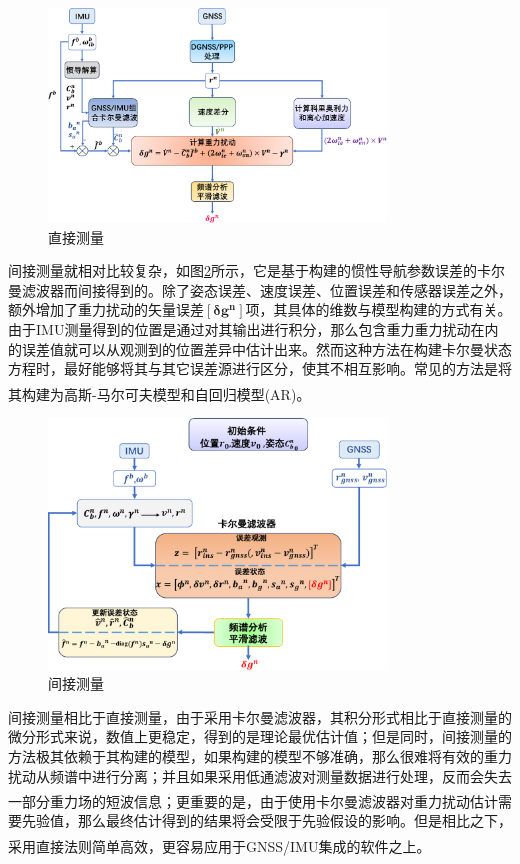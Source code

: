 \documentclass[12pt,a4,utf8]{article}
\newcommand{\upcite}[1]{\textsuperscript{\textsuperscript{\cite{#1}}}} %
\begin{document}
\begin{figure}[h]
      \centering
      \includegraphics[width=0.8\textwidth]{figure/direct-crop.pdf}
      \caption{\label{fig:direct}直接测量}
\end{figure}

间接测量就相对比较复杂，如图\ref{fig:indirect}所示，它是基于构建的惯性导航参数误差的卡尔曼滤波器而间接得到的。除了姿态误差、速度误差、位置误差和传感器误差之外，额外增加了重力扰动的矢量误差$\bm{[\delta g^n]}$项，其具体的维数与模型构建的方式有关。由于IMU测量得到的位置是通过对其输出进行积分，那么包含重力重力扰动在内的误差值就可以从观测到的位置差异中估计出来。然而这种方法在构建卡尔曼状态方程时，最好能够将其与其它误差源进行区分，使其不相互影响。常见的方法是将其构建为高斯-马尔可夫模型\upcite{jekeli1994airborne,jordan1972self}和自回归模型(AR)\upcite{bruton2000improving,nassar2004modeling}。
\begin{figure}[h]
      \centering
      \includegraphics[width=0.8\textwidth]{figure/indirect-crop.pdf}
      \caption{\label{fig:indirect}间接测量}
\end{figure}
间接测量相比于直接测量，由于采用卡尔曼滤波器，其积分形式相比于直接测量的微分形式来说，数值上更稳定，得到的是理论最优估计值；但是同时，间接测量的方法极其依赖于其构建的模型，如果构建的模型不够准确，那么很难将有效的重力扰动从频谱中进行分离；并且如果采用低通滤波对测量数据进行处理，反而会失去一部分重力场的短波信息\upcite{schwarz1997introduction}；更重要的是，由于使用卡尔曼滤波器对重力扰动估计需要先验值，那么最终估计得到的结果将会受限于先验假设的影响。但是相比之下，采用直接法则简单高效，更容易应用于GNSS/IMU集成的软件之上\upcite{jekeli2023inertial}。
\end{document}
